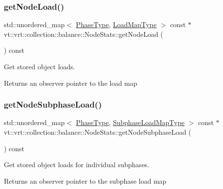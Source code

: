 \subsubsection{\texorpdfstring{get\+Node\+Load()}{getNodeLoad()}}
{\footnotesize\ttfamily std\+::unordered\+\_\+map$<$ \hyperlink{namespacevt_a46ce6733d5cdbd735d561b7b4029f6d7}{Phase\+Type}, \hyperlink{namespacevt_1_1vrt_1_1collection_1_1balance_a45306ee4bf38fe3fb586d1ee2fa3d147}{Load\+Map\+Type} $>$ const  $\ast$ vt\+::vrt\+::collection\+::balance\+::\+Node\+Stats\+::get\+Node\+Load (\begin{DoxyParamCaption}{ }\end{DoxyParamCaption}) const}



Get stored object loads. 

\begin{DoxyReturn}{Returns}
an observer pointer to the load map 
\end{DoxyReturn}
\mbox{\label{structvt_1_1vrt_1_1collection_1_1balance_1_1_node_stats_a24660f52ff5e6a734a443ebbd1852519}} 
\subsubsection{\texorpdfstring{get\+Node\+Subphase\+Load()}{getNodeSubphaseLoad()}}
{\footnotesize\ttfamily std\+::unordered\+\_\+map$<$ \hyperlink{namespacevt_a46ce6733d5cdbd735d561b7b4029f6d7}{Phase\+Type}, \hyperlink{namespacevt_1_1vrt_1_1collection_1_1balance_a3d91523158c1025b7b665240072f3b7e}{Subphase\+Load\+Map\+Type} $>$ const  $\ast$ vt\+::vrt\+::collection\+::balance\+::\+Node\+Stats\+::get\+Node\+Subphase\+Load (\begin{DoxyParamCaption}{ }\end{DoxyParamCaption}) const}



Get stored object loads for individual subphases. 

\begin{DoxyReturn}{Returns}
an observer pointer to the subphase load map 
\end{DoxyReturn}
\mbox{\label{structvt_1_1vrt_1_1collection_1_1balance_1_1_node_stats_a06128ad9d9dff72bad160b015054b054}} 
